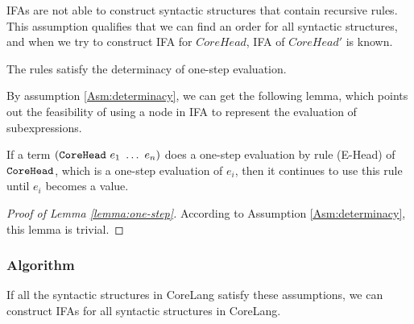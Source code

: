 IFAs are not able to construct syntactic structures that contain recursive rules. This assumption qualifies that we can find an order for all syntactic structures, and when we try to construct IFA for $CoreHead$, IFA of $CoreHead'$ is known.

\begin{Asm}
\label{Asm:determinacy}
The rules satisfy the determinacy of one-step evaluation.
\end{Asm}

By assumption \ref{Asm:determinacy}, we can get the following lemma, which points out the feasibility of using a node in IFA to represent the evaluation of subexpressions.

\begin{lemma}
\label{lemma:one-step}
If a term $(\mbox{\tt CoreHead}~e_1~\ldots~e_n)$ does a one-step evaluation by rule (E-Head) of $\mbox{\tt CoreHead}$, which is a one-step evaluation of $e_i$, then it continues to use this rule until $e_i$ becomes a value.
\end{lemma}

\begin{proof}[Proof of Lemma \ref{lemma:one-step}]
According to Assumption \ref{Asm:determinacy}, this lemma is trivial.
\end{proof}

\subsubsection{Algorithm}

\begin{mythm}
\label{mythm:Rule2IFA}
If all the syntactic structures in CoreLang satisfy these assumptions, we can construct IFAs for all syntactic structures in CoreLang.
\end{mythm}

